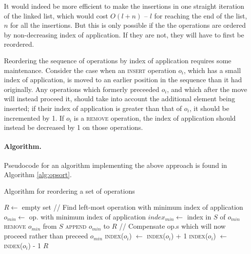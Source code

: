 It would indeed be more efficient to make the insertions in one straight
iteration of the linked list, which would cost $O(l+n)$ -- $l$ for reaching the
end of the list, $n$ for all the insertions. But this is only possible if the
the operations are ordered by non-decreasing index of application. If they are
not, they will have to first be reordered.

Reordering the sequence of operations by index of application requires some
maintenance. Consider the case when an \textsc{insert} operation $o_i$, which
has a small index of application, is moved to an earlier position in the
sequence than it had originally. Any operations which formerly preceeded $o_i$,
and which after the move will instead proceed it, should take into account the
additional element being inserted; if their index of application is greater than
that of $o_i$, it should be incremented by 1. If $o_i$ is a \textsc{remove}
operation, the index of application should instead be decreased by 1 on those
operations.

\paragraph{Algorithm.} Pseudocode for an algorithm implementing the above
approach is found in Algorithm \ref{alg:opsort}.

\begin{algorithm}[!ht]
  \caption{Algorithm for reordering a set of operations}
  \label{alg:opsort}
  \begin{algorithmic}[5]
      \State $R \gets$ empty set
        \State // Find left-most operation with minimum index of application
        \State $o_{min} \gets$ op. with minimum index of application
        \State $index_{min} \gets$ index in $S$ of $o_{min}$
        \State \textsc{remove} $o_{min}$ from $S$
        \State \textsc{append} $o_{min}$ to $R$
        \Statex
        \State // Compensate op.s which will now proceed rather than
        preceed $o_{min}$
            \State \textsc{index}($o_i$) $\gets$ \textsc{index}($o_i$) + 1
          \EndFor
            \State \textsc{index}($o_i$) $\gets$ \textsc{index}($o_i$) - 1
          \EndFor
        \EndIf
       \EndWhile
      \Statex
      \State \Return $R$
    \EndFunction
  \end{algorithmic}
\end{algorithm}

